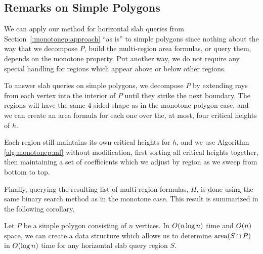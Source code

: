\subsection{Remarks on Simple Polygons}
\label{:monotonep:simplep}

We can apply our method for horizontal slab queries from 
Section~\ref{:monotonep:approach} ``as is'' to simple polygons since nothing 
about the way that we decompose $P$, build the multi-region area formulas, or 
query them, depends on the monotone property.
Put another way, we do not require any special handling for regions which appear 
above or below other regions.

To answer slab queries on simple polygons, we decompose $P$ by extending rays 
from each vertex into the interior of $P$ until they strike the next boundary.  
The regions will have the same 4-sided shape as in the monotone polygon case, 
and we can create an area formula for each one over the, at most, four critical 
heights of $h$.

Each region still maintains its own critical heights for $h$, and we use 
Algorithm \ref{alg:monotonep:mf} without modification, first sorting all 
critical heights together, then maintaining a set of coefficients which we 
adjust by region as we sweep from bottom to top.

Finally, querying the resulting list of multi-region formulas, $H$, is done 
using the same binary search method as in the monotone case. This result is 
summarized in the following corollary.

\begin{corollary}
\label{cor:monotonep:simplep-area}
Let $P$ be a simple polygon consisting of $n$ vertices.
In $O\!\left(n \log{n}\right)$ time and $O\!\left(n\right)$ space, we can create a data 
structure which allows us to determine $\operatorname{area}\!\left(S \cap P\right)$ in $O\!\left(\log{n}\right)$ 
time for any horizontal slab query region $S$.
\end{corollary}


